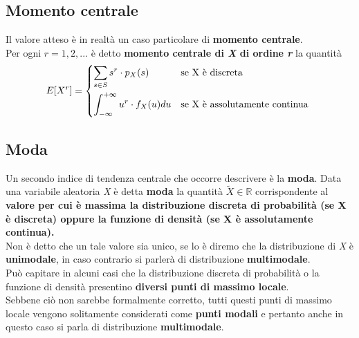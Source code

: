 \subsection{Momento centrale}
Il valore atteso è in realtà un caso particolare di \textbf{momento centrale}.\\
Per ogni $r = 1, 2, ...$ è detto \textbf{momento centrale di \textit{X} di ordine \textit{r}} la quantità
\begin{equation}
E[X^r] = 
	\begin{dcases*}
		\sum_{s \in S} s^r \cdot p_X(s) & \text{se X è discreta} \\
		\int_{-\infty}^{+\infty} u^r \cdot f_X(u) du & \text{se X è assolutamente continua}
	\end{dcases*}
\end{equation}

\subsection{Moda}
Un secondo indice di tendenza centrale che occorre descrivere è la \textbf{moda}. Data una variabile aleatoria \textit{X} è detta \textbf{moda} la quantità $\tilde{X} \in \mathbb{R}$ corrispondente al \textbf{valore per cui è massima la distribuzione discreta di probabilità (se X è discreta) oppure la funzione di densità (se X è assolutamente continua).} \\
Non è detto che un tale valore sia unico, se lo è diremo che la distribuzione di \textit{X} è
\textbf{unimodale}, in caso contrario si parlerà di distribuzione \textbf{multimodale}.\\
Può capitare in alcuni casi che la distribuzione discreta di probabilità o la funzione
di densità presentino \textbf{diversi punti di massimo locale}. \\
Sebbene ciò non sarebbe formalmente corretto, tutti questi punti di massimo
locale vengono solitamente considerati come \textbf{punti modali} e pertanto anche in
questo caso si parla di distribuzione \textbf{multimodale}.

